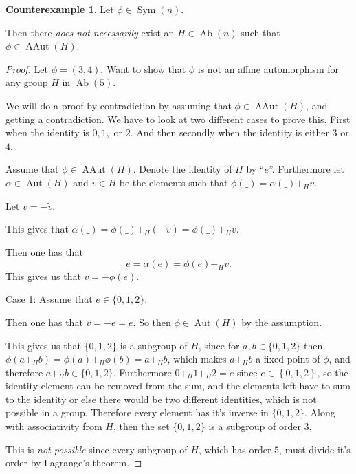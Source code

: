 \documentclass[a4paper, 12pt, english]{article}
\theoremstyle{plain}
\theoremstyle{definition}
\newtheorem{counterexample}[theorem]{Counterexample}
\newcommand{\set}[1]{ \left\{ #1 \right\} } %
\DeclareMathOperator{\Ab}{Ab}
\DeclareMathOperator{\Aut}{Aut}
\DeclareMathOperator{\AAut}{AAut}
\DeclareMathOperator{\Sym}{Sym}
\begin{document}
\begin{counterexample} \label{counterexample:ab-aaut}
    Let \( \phi \in \Sym(n) \).

    Then there \emph{does not necessarily} exist an \( H \in \Ab(n) \) such that \( \phi \in \AAut(H) \).
\end{counterexample}
\begin{proof} %
    Let \( \phi = (3, 4) \). Want to show that \( \phi \) is not an affine automorphism for any group \( H \) in \( \Ab(5) \).

    We will do a proof by contradiction by assuming that \( \phi \in \AAut(H) \), and getting a contradiction. We have to look at two different cases to prove this. First when the identity is \( 0, 1, \) or  \( 2 \). And then secondly when the identity is either \( 3 \) or \( 4 \).

    Assume that \( \phi \in \AAut(H) \). Denote the identity of \( H \) by ``\( e \)''. Furthermore let \( \alpha \in \Aut(H) \) and \( \tilde{v} \in H \) be the elements such that \( \phi(\_) = \alpha(\_) +_H \tilde{v} \).

    Let \( v = -\tilde{v} \).

    This gives that \( \alpha(\_) = \phi(\_) +_H (-\tilde{v}) = \phi(\_) +_H v \).

    Then one has that
    \[
        e = \alpha(e) = \phi(e) +_H v.
    \]
    This gives us that \( v = -\phi(e) \).

    Case 1: Assume that \( e \in \{ 0, 1, 2 \} \).

    Then one has that \( v = -e = e \). So then \( \phi \in \Aut(H) \) by the assumption. 
    
    This gives us that \( \{0, 1, 2\} \) is a subgroup of \( H \), since for \( a, b \in \{0, 1, 2 \} \) then \( \phi(a +_H b) = \phi(a) +_H \phi(b) = a +_H b \), which makes \( a +_H b \) a fixed-point of \( \phi \), and therefore \( a +_H b \in \{0, 1, 2 \} \). Furthermore \( 0 +_H 1 +_H 2 = e \) since \( e \in \set{0, 1, 2} \), so the identity element can be removed from the sum, and the elements left have to sum to the identity or else there would be two different identities, which is not possible in a group. Therefore every element has it's inverse in \( \{0, 1, 2 \} \). Along with associativity from \( H \), then the set \( \{0, 1, 2 \} \) is a subgroup of order \( 3 \).

    This is \emph{not possible} since every subgroup of \( H \), which has order \( 5 \), must divide it's order by Lagrange's theorem.


\end{proof}
\end{document}
